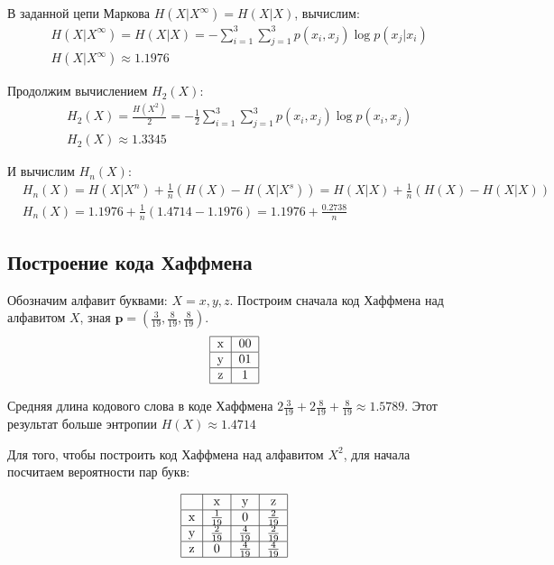 В заданной цепи Маркова $H(X|X^\infty) = H(X|X)$, вычислим:
\begin{equation}
    \begin{split}
        &H(X|X^\infty)=H(X|X)=-\sum\limits_{i=1}^3\sum\limits_{j=1}^3{p(x_i, x_j)\log{p(x_j|x_i)}} \\
        &H(X|X^\infty) \approx 1.1976
    \end{split}
\end{equation}

Продолжим вычислением $H_2(X)$:
\begin{equation}
    \begin{split}
        &H_2(X)=\frac{H(X^2)}2 = -\frac12 \sum\limits_{i=1}^3\sum\limits_{j=1}^3{p(x_i, x_j) \log{p(x_i, x_j)}} \\
        &H_2(X) \approx 1.3345
    \end{split}
\end{equation}

И вычислим $H_n(X)$:
\begin{equation}
    \begin{split}
        &H_n(X)=H(X|X^n)+\frac1n(H(X)-H(X|X^s))=H(X|X)+\frac1n(H(X)-H(X|X)) \\
        &H_n(X)=1.1976+\frac1n(1.4714-1.1976)=1.1976+\frac{0.2738}n
    \end{split}
\end{equation}

\subsection{Построение кода Хаффмена}
Обозначим алфавит буквами: $X={x,y,z}$. Построим сначала код Хаффмена над алфавитом $X$, зная $\mathbf{p} = \left(\frac3{19}, \frac8{19}, \frac8{19}\right)$.
\begin{equation}
\begin{tabular}{|c|c|c|}
\hline
x&00\\
\hline
y&01\\
\hline
z&1\\
\hline
\end{tabular}
\end{equation}

Средняя длина кодового слова в коде Хаффмена $2\frac3{19}+2\frac8{19}+\frac8{19} \approx 1.5789$. Этот результат больше энтропии $H(X) \approx 1.4714$

Для того, чтобы построить код Хаффмена над алфавитом $X^2$, для начала посчитаем вероятности пар букв:

\begin{equation}
    \begin{tabular}{|c|c|c|c|}
        \hline
        &x&y&z\\
        \hline
        x&$\frac{1}{19}$&0&$\frac{2}{19}$\\
        \hline
        y&$\frac{2}{19}$&$\frac{4}{19}$&$\frac{2}{19}$\\
        \hline
        z&0&$\frac{4}{19}$&$\frac{4}{19}$\\
        \hline        
    \end{tabular}
\end{equation}


